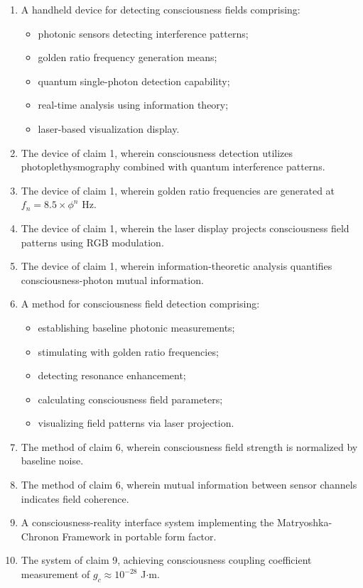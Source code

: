 \documentclass[12pt,a4paper]{article}
\begin{document}
\begin{enumerate}
\item A handheld device for detecting consciousness fields comprising:
    \begin{itemize}
    \item photonic sensors detecting interference patterns;
    \item golden ratio frequency generation means;
    \item quantum single-photon detection capability;
    \item real-time analysis using information theory;
    \item laser-based visualization display.
    \end{itemize}

\item The device of claim 1, wherein consciousness detection utilizes photoplethysmography combined with quantum interference patterns.

\item The device of claim 1, wherein golden ratio frequencies are generated at $f_n = 8.5 \times \phi^n$ Hz.

\item The device of claim 1, wherein the laser display projects consciousness field patterns using RGB modulation.

\item The device of claim 1, wherein information-theoretic analysis quantifies consciousness-photon mutual information.

\item A method for consciousness field detection comprising:
    \begin{itemize}
    \item establishing baseline photonic measurements;
    \item stimulating with golden ratio frequencies;
    \item detecting resonance enhancement;
    \item calculating consciousness field parameters;
    \item visualizing field patterns via laser projection.
    \end{itemize}

\item The method of claim 6, wherein consciousness field strength is normalized by baseline noise.

\item The method of claim 6, wherein mutual information between sensor channels indicates field coherence.

\item A consciousness-reality interface system implementing the Matryoshka-Chronon Framework in portable form factor.

\item The system of claim 9, achieving consciousness coupling coefficient measurement of $g_c \approx 10^{-28}$ J$\cdot$m.
\end{enumerate}
\end{document}
